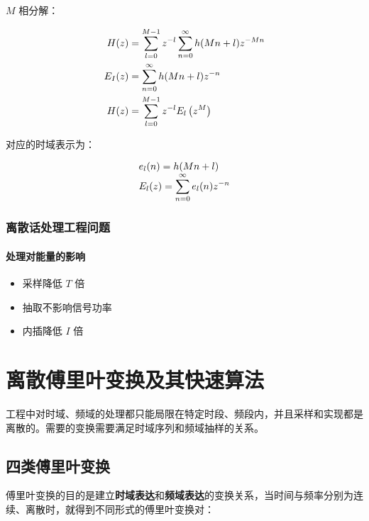 \documentclass[cn,11pt,chinese,black,simple]{elegantbook}
\begin{document}
\(M\) 相分解：

\[\begin{aligned}
    H(z) &=\displaystyle\sum_{l=0}^{M-1} z^{-l} \displaystyle\sum_{n=0}^{\infty} h(M n+l) z^{-M n} \\
    E_{I}(z) &=\displaystyle\sum_{n=0}^{\infty} h(M n+l) z^{-n} \\
    H(z) &=\displaystyle\sum_{l=0}^{M-1} z^{-l} E_{l}\left(z^{M}\right)
\end{aligned}\]

对应的时域表示为：

\[
\begin{array}{l}
e_{l}(n)=h(M n+l) \\
E_{l}(z)=\displaystyle\sum_{n=0}^{\infty} e_{l}(n) z^{-n}
\end{array}
\]

\subsection{离散话处理工程问题}

\subsubsection{处理对能量的影响}

\begin{itemize}
    \item 采样降低 \(T\) 倍
    \item 抽取不影响信号功率
    \item 内插降低 \(I\) 倍
\end{itemize}

\chapter{离散傅里叶变换及其快速算法}

工程中对时域、频域的处理都只能局限在特定时段、频段内，并且采样和实现都是离散的。需要的变换需要满足时域序列和频域抽样的关系。

\section{四类傅里叶变换}

傅里叶变换的目的是建立\textbf{时域表达}和\textbf{频域表达}的变换关系，当时间与频率分别为连续、离散时，就得到不同形式的傅里叶变换对：
\end{document}

